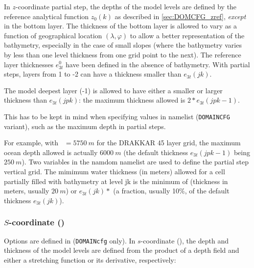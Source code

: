 \documentclass[../main/NEMO_manual]{subfiles}
\begin{document}
In $z$-coordinate partial step, the depths of the model levels are defined by the
reference analytical function $z_0(k)$ as described in \autoref{sec:DOMCFG_zref},
\textit{except} in the bottom layer.  The thickness of the bottom layer is allowed to vary
as a function of geographical location $(\lambda,\varphi)$ to allow a better
representation of the bathymetry, especially in the case of small slopes (where the
bathymetry varies by less than one level thickness from one grid point to the next).  The
reference layer thicknesses $e_{3t}^0$ have been defined in the absence of bathymetry.
With partial steps, layers from 1 to -2 can have a thickness smaller than
$e_{3t}(jk)$.

The model deepest layer (-1) is allowed to have either a smaller or larger
thickness than $e_{3t}(jpk)$: the maximum thickness allowed is $2*e_{3t}(jpk - 1)$.

This has to be kept in mind when specifying values in  namelist
(\texttt{DOMAINCFG} variant), such as the maximum depth  in partial steps.

For example, with ~$= 5750~m$ for the DRAKKAR 45 layer grid, the maximum ocean
depth allowed is actually $6000~m$ (the default thickness $e_{3t}(jpk - 1)$ being
$250~m$).  Two variables in the namdom namelist are used to define the partial step
vertical grid.  The mimimum water thickness (in meters) allowed for a cell partially
filled with bathymetry at level jk is the minimum of  (thickness in
meters, usually $20~m$) or $e_{3t}(jk)*$ (a fraction, usually 10\%, of
the default thickness $e_{3t}(jk)$).

\subsubsection[$S$-coordinate (\forcode{ln_sco})]{$S$-coordinate (\protect{})}
\label{sec:DOMCFG_sco}
\begin{listing}
  \caption{}
  \label{lst:namzgr_sco_domcfg}
\end{listing}
Options are defined in  (\texttt{DOMAINcfg} only).
In $s$-coordinate (), the depth and thickness of the model levels are defined from
the product of a depth field and either a stretching function or its derivative, respectively:
\end{document}
